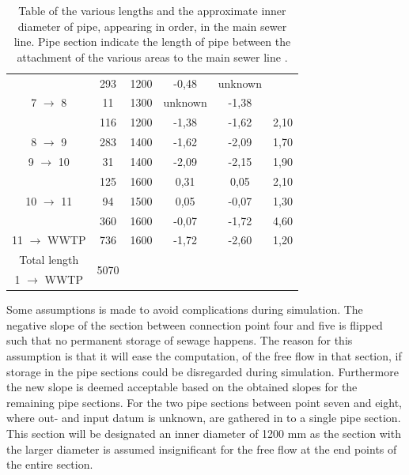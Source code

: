 \begin{table} [H]
\begin{tabular}{|c|c|c|c|c|c|}
 										 & 293			  & 1200   & -0,48  & unknown&  \\
7 $\rightarrow$ 8						 & 11 			  & 1300   & unknown& -1,38&  \\
			 							 & 116			  & 1200   & -1,38  & -1,62&  2,10\\ \hline
8 $\rightarrow$ 9						 & 283			  & 1400   & -1,62  & -2,09&  1,70\\ \hline
9 $\rightarrow$ 10						 & 31			  & 1400   & -2,09  & -2,15& 1,90 \\ \hline
										 & 125			  & 1600   & 0,31   & 0,05 & 2,10 \\
10 $\rightarrow$ 11	 	 				 & 94			  & 1500   & 0,05   & -0,07& 1,30\\
						 			 	 & 360 			  & 1600   & -0,07  & -1,72& 4,60 \\ \hline
11 $\rightarrow$ WWTP   				 & 736			  & 1600   & -1,72  & -2,60& 1,20\\ \hline
Total length 		    				 & \multirow{2}{*}{5070}  &	  & & & 	 \\ 
1 $\rightarrow$ WWTP    				 &						  &   & & & \\ \hline

\end{tabular}

\caption{Table of the various lengths and the approximate inner diameter of pipe, appearing in order, in the main sewer line. Pipe section indicate the length of pipe between the attachment of the various areas to the main sewer line \cite{GIS_kort}.} 
\label{tab:kloak_diameter}
\end{table}

Some assumptions is made to avoid complications during simulation. The negative slope of the section between connection point four and five is flipped such that no permanent storage of sewage happens. The reason for this assumption is that it will ease the computation, of the free flow in that section, if storage in the pipe sections could be disregarded during simulation. Furthermore the new slope is deemed acceptable based on the obtained slopes for the remaining pipe sections. 
For the two pipe sections between point seven and eight, where out- and input datum is unknown, are gathered in to a single pipe section. This section will be designated an inner diameter of 1200 mm as the section with the larger diameter is assumed insignificant for the free flow at the end points of the entire section.

